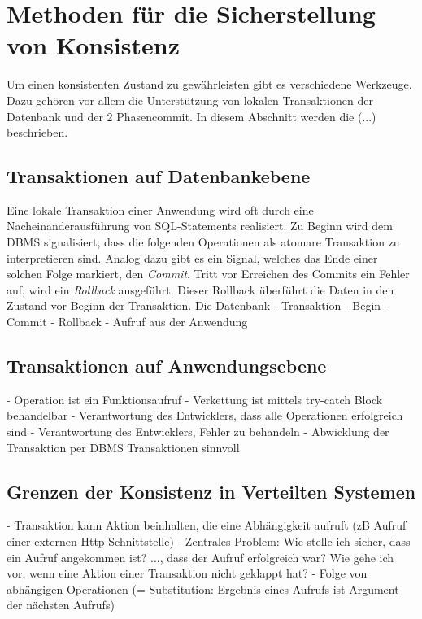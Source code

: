 \section{Methoden für die Sicherstellung von Konsistenz}

Um einen konsistenten Zustand zu gewährleisten gibt es verschiedene Werkzeuge. Dazu gehören vor allem die Unterstützung von lokalen Transaktionen der Datenbank und der 2 Phasencommit. In diesem Abschnitt werden die (...) beschrieben. %

\subsection{Transaktionen auf Datenbankebene}
Eine lokale Transaktion einer Anwendung wird oft durch eine Nacheinanderausführung von SQL-Statements realisiert. Zu Beginn wird dem DBMS signalisiert, dass die folgenden Operationen als atomare Transaktion zu interpretieren sind. Analog dazu gibt es ein Signal, welches das Ende einer solchen Folge markiert, den \textit{Commit}. Tritt vor Erreichen des Commits ein Fehler auf, wird ein \textit{Rollback} ausgeführt. Dieser Rollback überführt die Daten in den Zustand vor Beginn der Transaktion. Die Datenbank 
- Transaktion
- Begin
- Commit
- Rollback
- Aufruf aus der Anwendung

\subsection{Transaktionen auf Anwendungsebene}
- Operation ist ein Funktionsaufruf
- Verkettung ist mittels try-catch Block behandelbar
- Verantwortung des Entwicklers, dass alle Operationen erfolgreich sind 
- Verantwortung des Entwicklers, Fehler zu behandeln
- Abwicklung der Transaktion per DBMS Transaktionen sinnvoll

\subsection{Grenzen der Konsistenz in Verteilten Systemen}
- Transaktion kann Aktion beinhalten, die eine Abhängigkeit aufruft (zB Aufruf einer externen Http-Schnittstelle)
- Zentrales Problem: Wie stelle ich sicher, dass ein Aufruf angekommen ist? ..., dass der Aufruf erfolgreich war? Wie gehe ich vor, wenn eine Aktion einer Transaktion nicht geklappt hat?
- Folge von abhängigen Operationen (= Substitution: Ergebnis eines Aufrufs ist Argument der nächsten Aufrufs)

